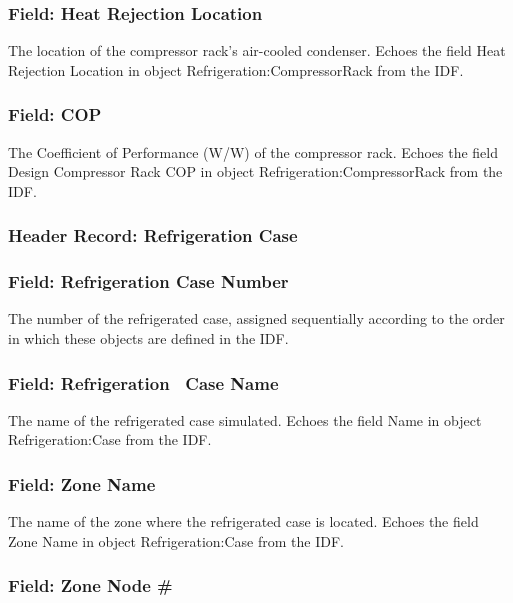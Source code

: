 \subsubsection{Field: Heat Rejection Location}\label{field-heat-rejection-location}

The location of the compressor rack's air-cooled condenser. Echoes the field Heat Rejection Location in object Refrigeration:CompressorRack from the IDF.

\subsubsection{Field: COP}\label{field-cop}

The Coefficient of Performance (W/W) of the compressor rack. Echoes the field Design Compressor Rack COP in object Refrigeration:CompressorRack from the IDF.

\subsubsection{Header Record: Refrigeration Case}\label{header-record-refrigeration-case}

\subsubsection{Field: Refrigeration Case Number}\label{field-refrigeration-case-number}

The number of the refrigerated case, assigned sequentially according to the order in which these objects are defined in the IDF.

\subsubsection{Field: Refrigeration~ Case Name}\label{field-refrigeration-case-name}

The name of the refrigerated case simulated. Echoes the field Name in object Refrigeration:Case from the IDF.

\subsubsection{Field: Zone Name}\label{field-zone-name-12}

The name of the zone where the refrigerated case is located. Echoes the field Zone Name in object Refrigeration:Case from the IDF.

\subsubsection{Field: Zone Node \#}\label{field-zone-node}

